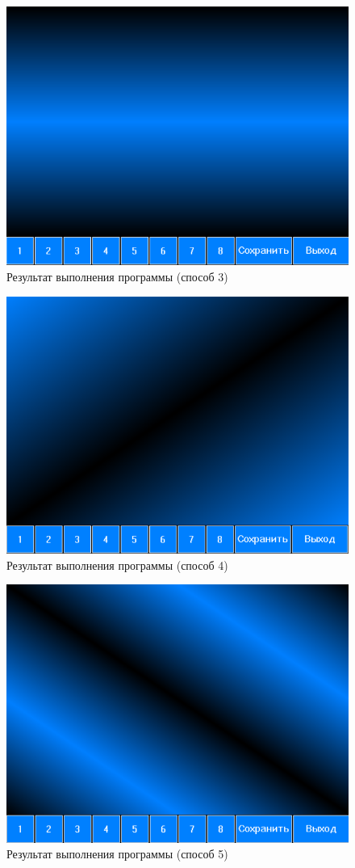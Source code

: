 \documentclass[14pt, a4paper]{extreport}
\begin{document}
\begin{figure}[h!]
	\centering
	\includegraphics[width = 12cm]{image/image_3}
  \caption{Результат выполнения программы (способ 3)}
\end{figure}

\begin{figure}[h!]
	\centering
	\includegraphics[width = 12cm]{image/image_4}
  \caption{Результат выполнения программы (способ 4)}
\end{figure}

\begin{figure}[h!]
	\centering
	\includegraphics[width = 12cm]{image/image_5}
  \caption{Результат выполнения программы (способ 5)}
\end{figure}
\end{document}
